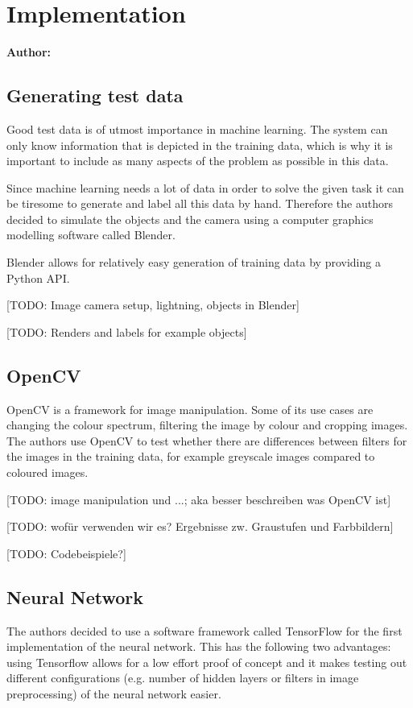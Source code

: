 \chapter{Implementation}

\textbf{Author: } 

\section{Generating test data}
Good test data is of utmost importance in machine learning. The system can only know information that is depicted in the training data, which is why it is important to include as many aspects of the problem as possible in this data.

Since machine learning needs a lot of data in order to solve the given task it can be tiresome to generate and label all this data by hand. Therefore the authors decided to simulate the objects and the camera using a computer graphics modelling software called Blender.

Blender allows for relatively easy generation of training data by providing a Python API.

[TODO: Image camera setup, lightning, objects in Blender]

[TODO: Renders and labels for example objects]

\section{OpenCV}
OpenCV is a framework for image manipulation. Some of its use cases are changing the colour spectrum, filtering the image by colour and cropping images. The authors use OpenCV to test whether there are differences between filters for the images in the training data, for example greyscale images compared to coloured images.

[TODO: image manipulation und ...; aka besser beschreiben was OpenCV ist]

[TODO: wofür verwenden wir es? Ergebnisse zw. Graustufen und Farbbildern]

[TODO: Codebeispiele?]

\section{Neural Network}
The authors decided to use a software framework called TensorFlow for the first implementation of the neural network. This has the following two advantages: using Tensorflow allows for a low effort proof of concept and it makes testing out different configurations (e.g. number of hidden layers or filters in image preprocessing) of the neural network easier.

